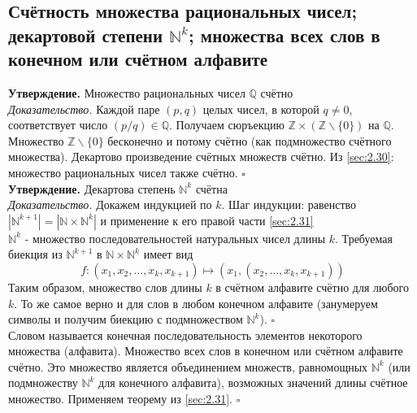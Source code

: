 \documentclass[a4paper]{article}
\newcommand{\qed}{\hfill$\square$}
\begin{document}
\subsection{Счётность множества рациональных чисел; декартовой степени $\mathbb{N}^k$; множества всех слов в конечном или счётном алфавите}
\textbf{Утверждение.} Множество рациональных чисел $\mathbb{Q}$ счётно\\[2mm]
\textit{Доказательство.} Каждой паре $(p, q)$ целых чисел, в которой $q \neq 0$, соответствует число $(p / q)\in\mathbb{Q}$. Получаем сюръекцию $\mathbb{Z} \times(\mathbb{Z} \backslash\{0\})$ на $\mathbb{Q}$. Множество $\mathbb{Z} \backslash\{0\}$ бесконечно и потому счётно (как подмножество счётного множества). Декартово произведение счётных множеств счётно. Из \ref{sec:2.30}: множество рациональных чисел также счётно. \qed\\[2mm]
\textbf{Утверждение.} Декартова степень $\mathbb{N}^{k}$ счётна\\[2mm]
\textit{Доказательство.} Докажем индукцией по $k$. Шаг индукции: равенство $\left|\mathbb{N}^{k+1}\right|=\left|\mathbb{N} \times \mathbb{N}^{k}\right|$ и применение к его правой части \ref{sec:2.31}\\[2mm]
\indent $\mathbb{N}^{k}$ - множество последовательностей натуральных чисел длины $k$. Требуемая биекция из $\mathbb{N}^{k+1}$ в $\mathbb{N} \times \mathbb{N}^{k}$ имеет вид
$$
f:\left(x_{1}, x_{2}, \ldots, x_{k}, x_{k+1}\right) \mapsto\left(x_{1},\left(x_{2}, \ldots, x_{k}, x_{k+1}\right)\right)
$$
\indent Таким образом, множество слов длины $k$ в счётном алфавите счётно для любого $k$. То же самое верно и для слов в любом конечном алфавите (занумеруем символы и получим биекцию с подмножеством $\mathbb{N}^{k}$). \qed\\[2mm]
\indent Словом называется конечная последовательность элементов некоторого множества (алфавита). Множество всех слов в конечном или счётном алфавите счётно. Это множество является объединением множеств, равномощных $\mathbb{N}^{k}$ (или подмножеству $\mathbb{N}^{k}$ для конечного алфавита), возможных значений длины счётное множество. Применяем теорему из \ref{sec:2.31}. \qed
\end{document}
